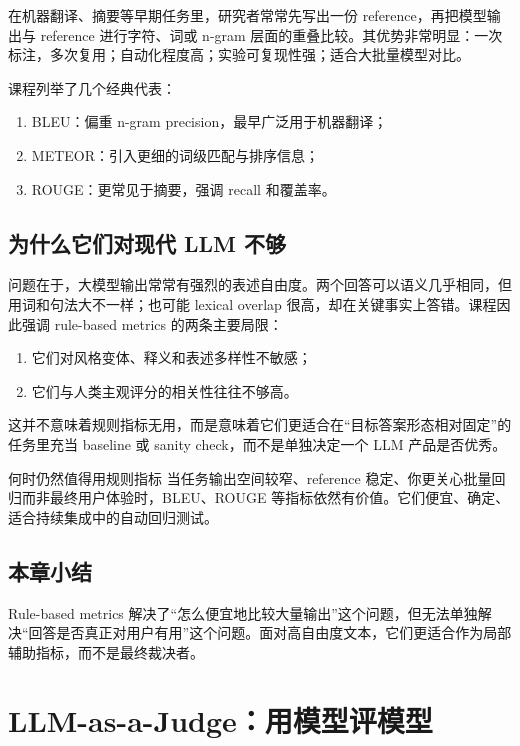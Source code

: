 \documentclass[a4paper]{article}
\begin{document}
在机器翻译、摘要等早期任务里，研究者常常先写出一份 reference，再把模型输出与 reference 进行字符、词或 n-gram 层面的重叠比较。其优势非常明显：一次标注，多次复用；自动化程度高；实验可复现性强；适合大批量模型对比。

课程列举了几个经典代表：

\begin{enumerate}
\item BLEU：偏重 n-gram precision，最早广泛用于机器翻译；
\item METEOR：引入更细的词级匹配与排序信息；
\item ROUGE：更常见于摘要，强调 recall 和覆盖率。
\end{enumerate}

\subsection{为什么它们对现代 LLM 不够}

问题在于，大模型输出常常有强烈的表述自由度。两个回答可以语义几乎相同，但用词和句法大不一样；也可能 lexical overlap 很高，却在关键事实上答错。课程因此强调 rule-based metrics 的两条主要局限：

\begin{enumerate}
\item 它们对风格变体、释义和表述多样性不敏感；
\item 它们与人类主观评分的相关性往往不够高。
\end{enumerate}

这并不意味着规则指标无用，而是意味着它们更适合在“目标答案形态相对固定”的任务里充当 baseline 或 sanity check，而不是单独决定一个 LLM 产品是否优秀。

\begin{knowledgebox}{何时仍然值得用规则指标}
当任务输出空间较窄、reference 稳定、你更关心批量回归而非最终用户体验时，BLEU、ROUGE 等指标依然有价值。它们便宜、确定、适合持续集成中的自动回归测试。
\end{knowledgebox}

\subsection{本章小结}

Rule-based metrics 解决了“怎么便宜地比较大量输出”这个问题，但无法单独解决“回答是否真正对用户有用”这个问题。面对高自由度文本，它们更适合作为局部辅助指标，而不是最终裁决者。

\section{LLM-as-a-Judge：用模型评模型}
\end{document}
